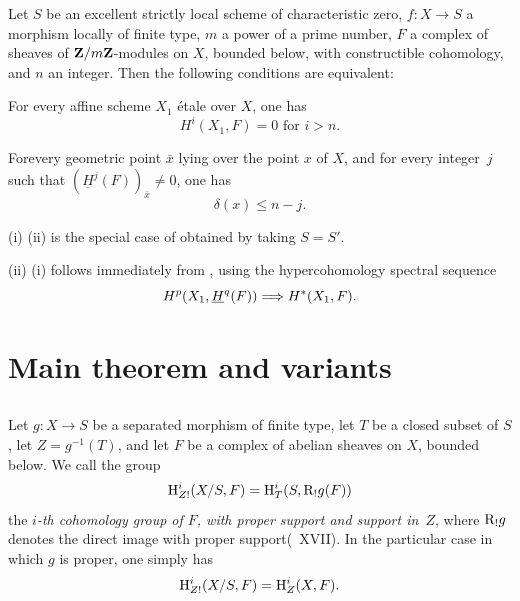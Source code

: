 \begin{corollaire} \label{XIV.3.7}
Let $S$ be an excellent strictly local scheme of characteristic zero, $f:X \to S$ a morphism locally of finite type, $m$ a power of a prime number, $F$ a complex of sheaves of $\mathbf Z/m\mathbf Z$-modules on $X$, bounded\sisi{}{} below, with constructible cohomology, and $n$ an integer. Then the following conditions are equivalent:
\begin{enumeratei}
\item
For every affine scheme $X_1$ \'{e}tale over $X$, one has
$$
H^i(X_1, F)=0\text{ for }i>n.
$$

\item
For\pageoriginale every geometric point $\bar{x}$ lying over the point $x$ of $X$, and for every integer~$j$ such that $(\underline{H}^j(F))_{\bar{x}} \neq 0$, one has
$$
\delta(x) \leq n-j.
$$
\end{enumeratei}
\end{corollaire}

\textup{(i)} \ALORS \textup{(ii)} is the special case of  obtained by taking $S=S'$.

\textup{(ii)} \ALORS \textup{(i)} follows immediately from , using the hypercohomology spectral sequence
$$
H^p(X_1, \underline{H}^q(F)) \Longrightarrow H^*(X_1, F).
$$

\section{Main theorem and variants} \label{XIV.4}

\setcounter{subsection}{-1}

\subsection{\texorpdfstring{}{XIV.4.0}} \label{XIV.4.0}
Let $g\colon X\to S$ be a separated morphism of finite type, let $T$ be a closed subset of $S$, let \hbox{$Z=g^{-1}(T)$}, and let $F$ be a complex of abelian sheaves on $X$, bounded below. We call the group
$$
\mathrm H_{Z!}^{i}(X/S, F)=\mathrm H_{T}^{i}(S, \mathrm R_{!}g(F))
$$
the \emph{$i$-th cohomology group of $F$, with proper support and support in~$Z$}, where $\mathrm R_{!}g$ denotes the \og direct image with proper support\fg (~XVII). In the particular case in which $g$ is proper, one simply has
$$
\mathrm H_{Z!}^{i}(X/S, F)=\mathrm H_{Z}^{i}(X, F).
$$


